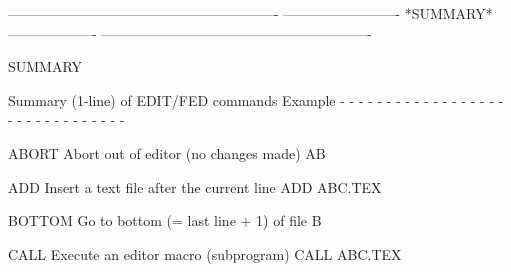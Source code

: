  
 
 
 
 
 
 
 
 
 
 
 
 
 
 
 
 
 
 
 
 
 
 
 
 
 
 
 
 
 
 
 
 
 
 
 
 
 
 
 
 
 
 
 
 
 
 
 
 
 
 
 
 
 
 
 
 
 
 
 
 
 
 
 
 
 
 
 
 
 
 
 
 
 
 
 
 
 
 
 
 
 
 
----------------------------------------------------------
-------------------------  *SUMMARY*  -------------------
----------------------------------------------------------
 
SUMMARY
 
Summary (1-line) of EDIT/FED commands                 Example
- - - - - - - - - - - - - - - - - - - - - - - - - - - - - - -
 
ABORT     Abort out of editor (no changes made)       AB
 
ADD       Insert a text file after the current line   ADD ABC.TEX
 
BOTTOM    Go to bottom (= last line + 1) of file      B
 
CALL      Execute an editor macro (subprogram)        CALL ABC.TEX
 
